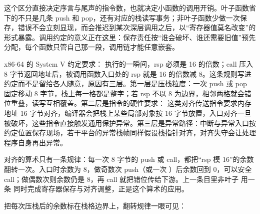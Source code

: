 这个区分直接决定序言与尾声的指令数，也就决定小函数的调用开销。叶子函数省下的不只是几条 push 和 pop，还有对应的栈读写事务；非叶子函数少做一次保存，错误不会立刻显现，而会推迟到某次深层调用之后，以“寄存器值莫名改变”的形式暴露。调用约定的意义正在这里：保存责任按“谁会破坏、谁还需要旧值”预先分配，每个函数只管自己那一段，调用链才能任意嵌套。

x86-64 的 System V 约定要求： 执行的一瞬间，rsp 必须是 16 的倍数；call 压入 8 字节返回地址后，被调用函数入口处的 rsp 就是 16 的倍数减 8。这条规则写进约定而不是留给各人随意，原因有三层。第一层是压栈粒度：一次 push 或 pop 固定移动 8 字节，栈上每一格都是整字；若 rsp 不以 8 为边界，相邻两格就会错位重叠，读写互相覆盖。第二层是指令的硬性要求： 这类对齐传送指令要求内存地址 16 字节对齐，编译器会把栈上某些局部对象按 16 字节放置，入口对齐一旦被破坏，这些指令直接触发通用保护异常。第三层是异常路径：中断与异常入口按约定位置保存现场，若干平台的异常栈帧同样假设栈指针对齐，对齐失守会让处理程序自身再出异常。

对齐的算术只有一条规律：每一次 8 字节的 push 或 call，都把“rsp 模 16”的余数翻转一次。入口时余数为 8，做奇数次 push（或一次 ）后余数回到 0，可以安全 call；做偶数次则余数仍是 8，再 call 就把错位传给下游。上一条目里非叶子  用一条  同时完成寄存器保存与对齐调整，正是这个算术的应用。

把每次压栈后的余数标在栈格边界上，翻转规律一眼可见：

